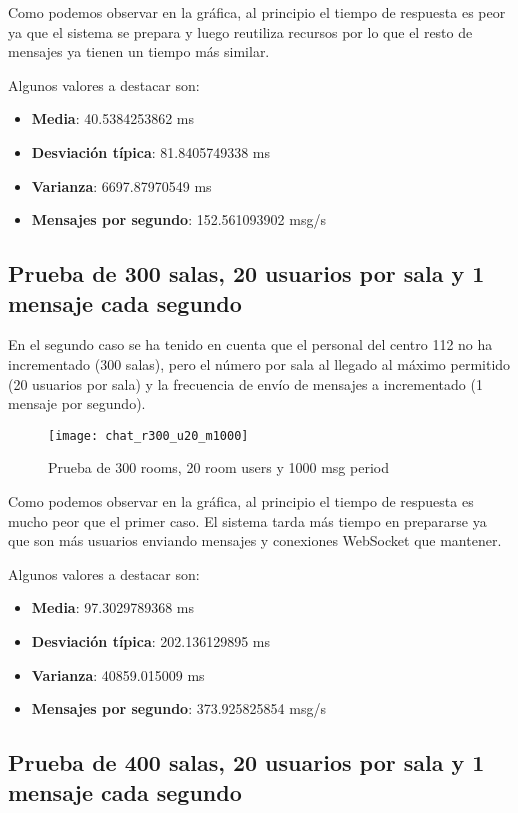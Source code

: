 Como podemos observar en la gráfica, al principio el tiempo de respuesta es peor ya que el sistema se prepara y luego reutiliza recursos por lo que el resto de mensajes ya tienen un tiempo más similar.

Algunos valores a destacar son:

\begin{itemize}
  \item \textbf{Media}: 40.5384253862 ms
  \item \textbf{Desviación típica}: 81.8405749338 ms
  \item \textbf{Varianza}: 6697.87970549 ms
  \item \textbf{Mensajes por segundo}: 152.561093902 msg/s
\end{itemize}

\subsection{Prueba de 300 salas, 20 usuarios por sala y 1 mensaje cada segundo}

En el segundo caso se ha tenido en cuenta que el personal del centro 112 no ha incrementado (300 salas), pero el número por sala al llegado al máximo permitido (20 usuarios por sala) y la frecuencia de envío de mensajes a incrementado (1 mensaje por segundo).

\begin{figure}[htp!]
  \centering
  \texttt{[image: chat\_r300\_u20\_m1000]}
  \caption{Prueba de 300 rooms, 20 room users y 1000 msg period}
  \label{fig:chat_r300_u20_m100}
\end{figure}

Como podemos observar en la gráfica, al principio el tiempo de respuesta es mucho peor que el primer caso. El sistema tarda más tiempo en prepararse ya que son más usuarios enviando mensajes y conexiones WebSocket que mantener.

Algunos valores a destacar son:

\begin{itemize}
  \item \textbf{Media}: 97.3029789368 ms
  \item \textbf{Desviación típica}: 202.136129895 ms
  \item \textbf{Varianza}: 40859.015009 ms
  \item \textbf{Mensajes por segundo}: 373.925825854 msg/s
\end{itemize}

\subsection{Prueba de 400 salas, 20 usuarios por sala y 1 mensaje cada segundo}

